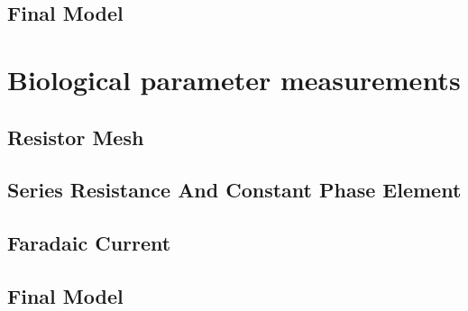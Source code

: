     \subsection{Final Model}

\section{Biological parameter measurements}
    \label{sect:sheep_measurements}
    \subsection{Resistor Mesh}
    \subsection{Series Resistance And Constant Phase Element}
    \subsection{Faradaic Current}
    \subsection{Final Model}

